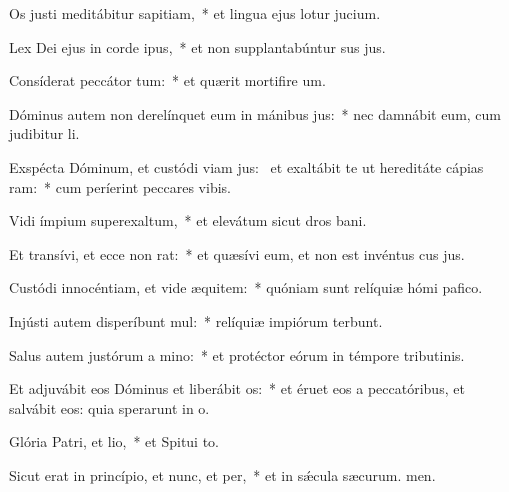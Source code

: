\item Os justi meditábitur sapitiam,~* et lingua ejus lotur jucium.
\item Lex Dei ejus in corde ipus,~* et non supplantabúntur sus jus.
\item Consíderat peccátor tum:~* et quærit mortifire um.
\item Dóminus autem non derelínquet eum in mánibus jus:~* nec damnábit eum, cum judibitur li.
\item Exspécta Dóminum, et custódi viam jus:~\pscross{} et exaltábit te ut hereditáte cápias ram:~* cum períerint peccares vibis.
\item Vidi ímpium superexaltum,~* et elevátum sicut dros bani.
\item Et transívi, et ecce non rat:~* et quæsívi eum, et non est invéntus cus jus.
\item Custódi innocéntiam, et vide æquitem:~* quóniam sunt relíquiæ hómi pafico.
\item Injústi autem disperíbunt mul:~* relíquiæ impiórum terbunt.
\item Salus autem justórum a mino:~* et protéctor eórum in témpore tributinis.
\item Et adjuvábit eos Dóminus et liberábit os:~* et éruet eos a peccatóribus, et salvábit eos: quia sperarunt in o.
\item Glória Patri, et lio,~* et Spitui to.
\item Sicut erat in princípio, et nunc, et per,~* et in sǽcula sæcurum. men.
